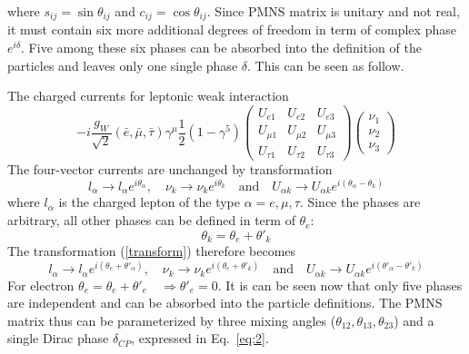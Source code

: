 \documentclass[a4 paper,12pt]{report}%
\begin{document}
where $s_{ij} = \sin{\theta_{ij}}$ and $c_{ij} = \cos\theta_{ij}$. Since PMNS matrix is unitary and not real, it must contain six more additional degrees of freedom in term of complex phase $e^{i\delta}$. Five among these six phases can be absorbed into the definition of the particles and leaves only one single phase $\delta$. This can be seen as follow.\par
The charged currents for leptonic weak interaction
$$-i\frac{g_W}{\sqrt{2}}(\bar{e}, \bar{\mu}, \bar{\tau})\gamma^{\mu}\frac{1}{2}(1-\gamma^5)\left(\begin{array}{ccc}U_{e1}& U_{e2} & U_{e3}\\U_{\mu 1} & U_{\mu 2} & U_{\mu 3}\\U_{\tau 1}& U_{\tau 2}& U_{\tau 3}\end{array}\right)\left(\begin{array}{ccc}\nu_1\\ \nu_2\\ \nu_3\end{array}\right)$$
The four-vector currents are unchanged by transformation
\begin{equation}\label{transform}
l_\alpha \rightarrow l_\alpha e^{i\theta_\alpha}, \quad \nu_k \rightarrow \nu_k e^{i\theta_k}\quad \text{and} \quad U_{\alpha k} \rightarrow U_{\alpha k} e^{i(\theta_\alpha - \theta_k)}
\end{equation}
where $l_\alpha$ is the charged lepton of the type $\alpha = e, \mu, \tau$. Since the phases are arbitrary, all other phases can be defined in term of $\theta_e$: 
$$\theta_k = \theta_e + \theta'_k$$
The transformation (\ref{transform}) therefore becomes
$$l_\alpha \rightarrow l_\alpha e^{i(\theta_e + \theta'_\alpha)}, \quad \nu_k \rightarrow \nu_k e^{i(\theta_e + \theta'_k)}\quad \text{and} \quad U_{\alpha k} \rightarrow U_{\alpha k} e^{i(\theta'_\alpha - \theta'_k)}$$
For electron $\theta_e = \theta_e + \theta'_e \quad \Rightarrow \theta'_e = 0$. It is can be seen now that only five phases are independent and can be absorbed into the particle definitions. The PMNS matrix thus can be parameterized by three mixing angles ($\theta_{12}, \theta_{13}, \theta_{23}$) and a single  Dirac phase $\delta_{CP}$, expressed in Eq.~\ref{eq:2}.
\end{document}
